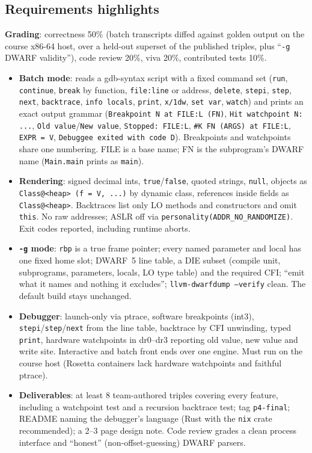 \documentclass[10pt]{article}
\newcommand{\code}[1]{\texttt{\small #1}}
\begin{document}
\subsection{Requirements highlights}\label{sec:p4-req}
\textbf{Grading}: correctness 50\% (batch transcripts diffed against golden output on the course x86-64 host, over a held-out superset of the published triples, plus ``\code{-g} DWARF validity''), code review 20\%, viva 20\%, contributed tests 10\%.
\begin{itemize}
\item \textbf{Batch mode}: reads a gdb-syntax script with a fixed command set (\code{run}, \code{continue}, \code{break} by function, \code{file:line} or address, \code{delete}, \code{stepi}, \code{step}, \code{next}, \code{backtrace}, \code{info locals}, \code{print}, \code{x/1dw}, \code{set var}, \code{watch}) and prints an exact output grammar (\code{Breakpoint N at FILE:L (FN)}, \code{Hit watchpoint N: ...}, \code{Old value}/\code{New value}, \code{Stopped: FILE:L}, \code{\#K FN (ARGS) at FILE:L}, \code{EXPR = V}, \code{Debuggee exited with code D}). Breakpoints and watchpoints share one numbering. FILE is a base name; FN is the subprogram's DWARF name (\code{Main.main} prints as \code{main}).
\item \textbf{Rendering}: signed decimal ints, \code{true}/\code{false}, quoted strings, \code{null}, objects as \code{Class@<heap> (f = V, ...)} by dynamic class, references inside fields as \code{Class@<heap>}. Backtraces list only LO methods and constructors and omit \code{this}. No raw addresses; ASLR off via \code{personality(ADDR\_NO\_RANDOMIZE)}. Exit codes reported, including runtime aborts.
\item \textbf{\code{-g} mode}: \code{rbp} is a true frame pointer; every named parameter and local has one fixed home slot; DWARF~5 line table, a DIE subset (compile unit, subprograms, parameters, locals, LO type table) and the required CFI; ``emit what it names and nothing it excludes''; \code{llvm-dwarfdump --verify} clean. The default build stays unchanged.
\item \textbf{Debugger}: launch-only via ptrace, software breakpoints (int3), \code{stepi}/\code{step}/\code{next} from the line table, backtrace by CFI unwinding, typed \code{print}, hardware watchpoints in dr0--dr3 reporting old value, new value and write site. Interactive and batch front ends over one engine. Must run on the course host (Rosetta containers lack hardware watchpoints and faithful ptrace).
\item \textbf{Deliverables}: at least 8 team-authored triples covering every feature, including a watchpoint test and a recursion backtrace test; tag \code{p4-final}; README naming the debugger's language (Rust with the \code{nix} crate recommended); a 2--3 page design note. Code review grades a clean process interface and ``honest'' (non-offset-guessing) DWARF parsers.
\end{itemize}
\end{document}
